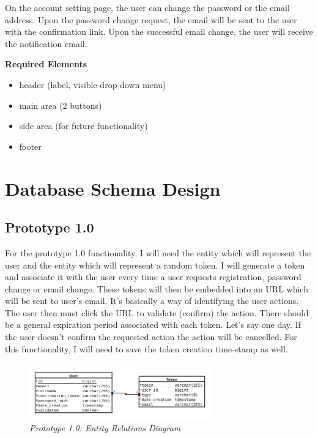 \documentclass[12pt,twoside,a4paper]{report}
\begin{document}
On the account setting page, the user can change the password or the email address. Upon the password change request, the email will be sent to the user with the confirmation link. Upon the successful email change, the user will receive the notification email.

\textbf{Required Elements}
\begin{itemize}\itemsep1pt \parskip0pt 
\item header (label, visible drop-down menu)
\item main area (2 buttons)
\item side area (for future functionality)
\item footer
\end{itemize}

\section{Database Schema Design}\label{3.8}

\subsection{Prototype 1.0}\label{3.8.1}
For the prototype 1.0 functionality, I will need the entity which will represent the user and the entity which will represent a random token. I will generate a token and associate it with the user every time a user requests registration, password change or email change. These tokens will then be embedded into an URL which will be sent to user's email. It's basically a way of identifying the user actions. The user then must click the URL to validate (confirm) the action. There should be a general expiration period associated with each token. Let's say one day. If the user doesn't confirm the requested action the action will be cancelled. For this functionality, I will need to save the token creation time-stamp as well.

\begin{figure}[!ht]
	\centering
		\includegraphics[width=0.7\textwidth, totalheight=6cm]
		{entity_relations_diagram1}
	\caption{\textit{Prototype 1.0: Entity Relations Diagram}}
	\label{f3.8.1}
\end{figure}
\end{document}
